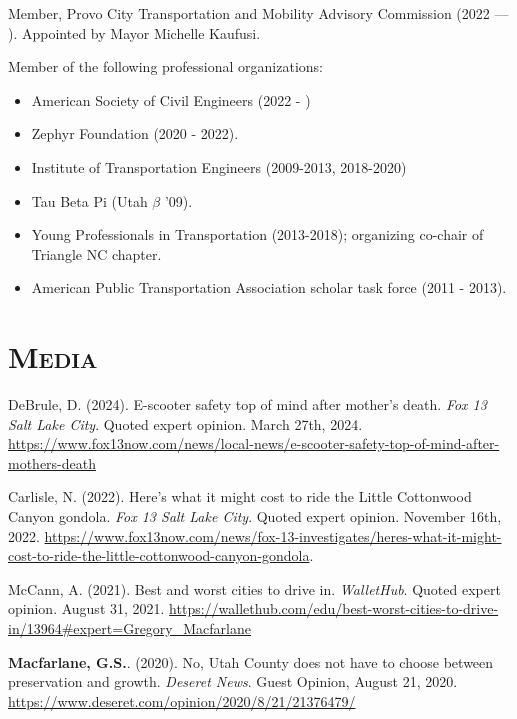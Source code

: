 \documentclass[margin,line]{res}
\newcommand{\secfont}{\scshape }
\begin{document}
\begin{resume}
Member, Provo City Transportation and Mobility Advisory Commission (2022 --- ). Appointed by Mayor Michelle Kaufusi.

Member of the following professional organizations:

\begin{itemize}
  \item American Society of Civil Engineers (2022 - )
  \item Zephyr Foundation (2020 - 2022).
  \item Institute of Transportation Engineers (2009-2013, 2018-2020)
  \item Tau Beta Pi (Utah $\beta$ '09).
  \item Young Professionals in Transportation (2013-2018); organizing co-chair of
Triangle NC chapter.
  \item American Public Transportation Association scholar task force (2011 - 2013).
\end{itemize}

\noindent\makebox[\linewidth]{\rule{\linewidth}{0.4pt}}

\section{\secfont Media}
DeBrule, D. (2024). E-scooter safety top of mind after mother's death. \textit{Fox 13 Salt Lake City}. Quoted expert opinion. March 27th, 2024. \url{https://www.fox13now.com/news/local-news/e-scooter-safety-top-of-mind-after-mothers-death}

Carlisle, N. (2022). Here’s what it might cost to ride the Little Cottonwood Canyon gondola. \textit{Fox 13 Salt Lake City}. Quoted expert opinion. November 16th, 2022. \url{https://www.fox13now.com/news/fox-13-investigates/heres-what-it-might-cost-to-ride-the-little-cottonwood-canyon-gondola}.

McCann, A. (2021). Best and worst cities to drive in. \textit{WalletHub}. Quoted expert opinion. August 31, 2021. \url{https://wallethub.com/edu/best-worst-cities-to-drive-in/13964#expert=Gregory_Macfarlane}

\textbf{Macfarlane, G.S.}. (2020). No, Utah County does not have to choose between preservation and growth. \textit{Deseret News}. Guest Opinion, August 21, 2020. \url{https://www.deseret.com/opinion/2020/8/21/21376479/}

\noindent\makebox[\linewidth]{\rule{\linewidth}{0.4pt}}

\end{resume}
\end{document}
